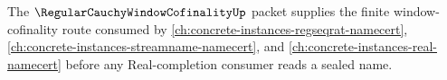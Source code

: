 The $\RegularCauchyWindowCofinalityUp$ packet supplies the finite window-cofinality route consumed by \autoref{ch:concrete-instances-regseqrat-namecert}, \autoref{ch:concrete-instances-streamname-namecert}, and \autoref{ch:concrete-instances-real-namecert} before any Real-completion consumer reads a sealed name.
